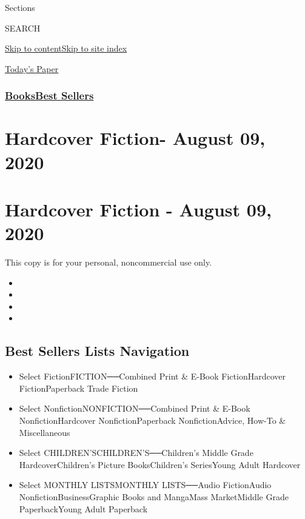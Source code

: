 Sections

SEARCH

\protect\hyperlink{site-content}{Skip to
content}\protect\hyperlink{site-index}{Skip to site index}

\href{https://myaccount.nytimes3xbfgragh.onion/auth/login?response_type=cookie\&client_id=vi}{}

\href{https://www.nytimes3xbfgragh.onion/section/todayspaper}{Today's
Paper}

\hypertarget{booksbest-sellers}{%
\subsubsection{\texorpdfstring{\href{/section/books/}{Books}\textbar{}\href{/books/best-sellers/}{Best
Sellers}}{Books\textbar{}Best Sellers}}\label{booksbest-sellers}}

\hypertarget{hardcover-fiction--august-09-2020}{%
\section{Hardcover Fiction- August 09,
2020}\label{hardcover-fiction--august-09-2020}}

\hypertarget{hardcover-fiction---august-09-2020}{%
\section{Hardcover Fiction - August 09,
2020}\label{hardcover-fiction---august-09-2020}}

This copy is for your personal, noncommercial use only.

\begin{itemize}
\item
\item
\item
\item
\end{itemize}

\hypertarget{best-sellers-lists-navigation}{%
\subsection{Best Sellers Lists
Navigation}\label{best-sellers-lists-navigation}}

\begin{itemize}
\tightlist
\item
  Select FictionFICTION──Combined Print \& E-Book FictionHardcover
  FictionPaperback Trade Fiction
\item
  Select NonfictionNONFICTION──Combined Print \& E-Book
  NonfictionHardcover NonfictionPaperback NonfictionAdvice, How-To \&
  Miscellaneous
\item
  Select CHILDREN'SCHILDREN'S──Children's Middle Grade
  HardcoverChildren's Picture BooksChildren's SeriesYoung Adult
  Hardcover
\item
  Select MONTHLY LISTSMONTHLY LISTS──Audio FictionAudio
  NonfictionBusinessGraphic Books and MangaMass MarketMiddle Grade
  PaperbackYoung Adult Paperback
\end{itemize}

